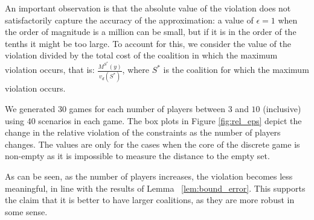\documentclass[sigconf, table]{acmart}
\begin{document}
An important observation is that the absolute value of the violation does not satisfactorily capture the accuracy of the approximation: a value of $\epsilon = 1$ when the order of magnitude is a million can be small, but if it is in the order of the tenths it might be too large. To account for this, we consider the value of the violation divided by the total cost of the coalition in which the maximum violation occurs, that is: $\frac{M^{S^*}(y)}{v_d(S^*)}$, where $S^*$ is the coalition for which the maximum violation occurs.

We generated $30$ games for each number of players between $3$ and $10$ (inclusive) using $40$ scenarios in each game.
The box plots in Figure \ref{fig:rel_eps} depict the change in the relative violation of the constraints as the number of players changes. The values are only for the cases when the core of the discrete game is non-empty as it is impossible to measure the distance to the empty set.

As can be seen, as the number of players increases, the violation becomes less meaningful, in line with the results of Lemma ~\ref{lem:bound_error}. This supports the claim that it is better to have larger coalitions, as they are more robust in some sense.
\end{document}
